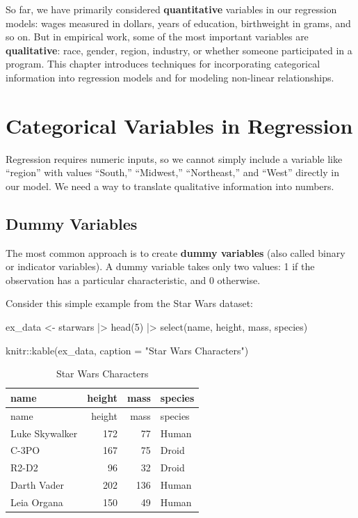 \documentclass[
  letterpaper,
  DIV=11,
  numbers=noendperiod]{scrreprt}
\newenvironment{Shaded}{\begin{snugshade}}{\end{snugshade}}
\newcommand{\AttributeTok}[1]{\textcolor[rgb]{0.40,0.45,0.13}{#1}}
\newcommand{\DecValTok}[1]{\textcolor[rgb]{0.68,0.00,0.00}{#1}}
\newcommand{\FunctionTok}[1]{\textcolor[rgb]{0.28,0.35,0.67}{#1}}
\newcommand{\NormalTok}[1]{\textcolor[rgb]{0.00,0.23,0.31}{#1}}
\newcommand{\OtherTok}[1]{\textcolor[rgb]{0.00,0.23,0.31}{#1}}
\newcommand{\SpecialCharTok}[1]{\textcolor[rgb]{0.37,0.37,0.37}{#1}}
\newcommand{\StringTok}[1]{\textcolor[rgb]{0.13,0.47,0.30}{#1}}
\begin{document}
So far, we have primarily considered \textbf{quantitative} variables in
our regression models: wages measured in dollars, years of education,
birthweight in grams, and so on. But in empirical work, some of the most
important variables are \textbf{qualitative}: race, gender, region,
industry, or whether someone participated in a program. This chapter
introduces techniques for incorporating categorical information into
regression models and for modeling non-linear relationships.

\section{Categorical Variables in
Regression}\label{categorical-variables-in-regression}

Regression requires numeric inputs, so we cannot simply include a
variable like ``region'' with values ``South,'' ``Midwest,''
``Northeast,'' and ``West'' directly in our model. We need a way to
translate qualitative information into numbers.

\subsection{Dummy Variables}\label{dummy-variables}

The most common approach is to create \textbf{dummy variables} (also
called binary or indicator variables). A dummy variable takes only two
values: 1 if the observation has a particular characteristic, and 0
otherwise.

Consider this simple example from the Star Wars dataset:

\begin{Shaded}
\begin{Highlighting}[]
\NormalTok{ex\_data }\OtherTok{\textless{}{-}}\NormalTok{ starwars }\SpecialCharTok{|\textgreater{}} 
    \FunctionTok{head}\NormalTok{(}\DecValTok{5}\NormalTok{) }\SpecialCharTok{|\textgreater{}} 
    \FunctionTok{select}\NormalTok{(name, height, mass, species)}

\NormalTok{knitr}\SpecialCharTok{::}\FunctionTok{kable}\NormalTok{(ex\_data, }\AttributeTok{caption =} \StringTok{"Star Wars Characters"}\NormalTok{)}
\end{Highlighting}
\end{Shaded}

\begin{longtable}[]{@{}lrrl@{}}
\caption{Star Wars Characters}\tabularnewline
\toprule\noalign{}
name & height & mass & species \\
\midrule\noalign{}
\endfirsthead
\toprule\noalign{}
name & height & mass & species \\
\midrule\noalign{}
\endhead
\bottomrule\noalign{}
\endlastfoot
Luke Skywalker & 172 & 77 & Human \\
C-3PO & 167 & 75 & Droid \\
R2-D2 & 96 & 32 & Droid \\
Darth Vader & 202 & 136 & Human \\
Leia Organa & 150 & 49 & Human \\
\end{longtable}
\end{document}
